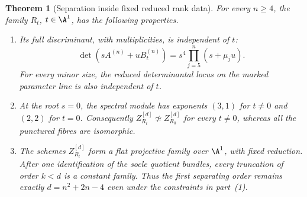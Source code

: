 \documentclass[11pt,reqno]{amsart}
\numberwithin{equation}{section}
\newtheorem{theorem}{Theorem}[section]
\theoremstyle{definition}\newtheorem{definition}[theorem]{Definition}
\theoremstyle{remark}\newtheorem{remark}[theorem]{Remark}
\begin{document}
\begin{theorem}[Separation inside fixed reduced rank data]
\label{thm:rank-preserving-specialization}
For every \(n\ge4\), the family \(R_t\), \(t\in\A^1\),
has the following properties.
\begin{enumerate}
\item Its full discriminant, with multiplicities, is independent of \(t\):
\begin{equation}\label{eq:fixed-discriminant-specialization}
 \det(sA^{(n)}+uB_t^{(n)})
       =s^4\prod_{j=5}^n(s+\mu_j u).
\end{equation}
For every minor size, the reduced determinantal locus on the marked
parameter line is also independent of \(t\).
\item At the root \(s=0\), the spectral module has exponents
\((3,1)\) for \(t\ne0\) and \((2,2)\) for \(t=0\).
Consequently \(Z_{R_t}^{[d]}\not\simeq Z_{R_0}^{[d]}\)
for every \(t\ne0\), whereas all the punctured fibres are isomorphic.
\item The schemes \(Z_{R_t}^{[d]}\) form a flat projective family
over \(\A^1\), with fixed reduction.  After one identification
of the socle quotient bundles, every truncation of order \(k<d\)
is a constant family.  Thus the first separating order remains
exactly \(d=n^2+2n-4\) even under the constraints in part~(1).
\end{enumerate}
\end{theorem}
\end{document}
